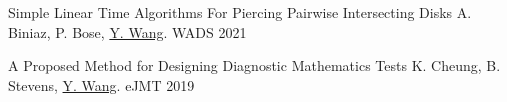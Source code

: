 
\begin{cvhonors}

\cvhonor
{Simple Linear Time Algorithms For Piercing Pairwise Intersecting Disks}
{A. Biniaz, P. Bose, \underline{Y. Wang}.}
{WADS}
{2021}

\cvhonor
{A Proposed Method for Designing Diagnostic Mathematics Tests}
{K. Cheung, B. Stevens, \underline{Y. Wang}.}
{eJMT}
{2019}

\end{cvhonors}


%
%
%
%
